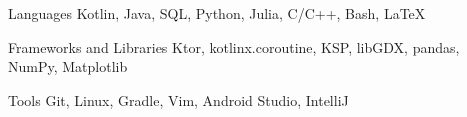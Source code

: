 

\begin{cvskills}

  \cvskill
    {Languages} %
    {Kotlin, Java, SQL, Python, Julia, C/C++, Bash, \LaTeX} %

  \cvskill
    {Frameworks and Libraries} %
    {Ktor, kotlinx.coroutine, KSP, libGDX, pandas, NumPy, Matplotlib} %

  \cvskill
    {Tools} %
    {Git, Linux, Gradle, Vim, Android Studio, IntelliJ} %

\end{cvskills}
